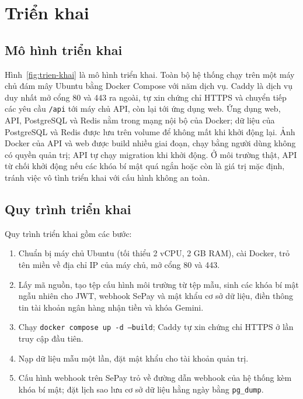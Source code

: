 \section{Triển khai}

\subsection{Mô hình triển khai}


Hình~\ref{fig:trien-khai} là mô hình triển khai. Toàn bộ hệ thống chạy trên một máy chủ đám mây Ubuntu bằng Docker Compose với năm dịch vụ. Caddy là dịch vụ duy nhất mở cổng 80 và 443 ra ngoài, tự xin chứng chỉ HTTPS và chuyển tiếp các yêu cầu \texttt{/api} tới máy chủ API, còn lại tới ứng dụng web. Ứng dụng web, API, PostgreSQL và Redis nằm trong mạng nội bộ của Docker; dữ liệu của PostgreSQL và Redis được lưu trên volume để không mất khi khởi động lại. Ảnh Docker của API và web được build nhiều giai đoạn, chạy bằng người dùng không có quyền quản trị; API tự chạy migration khi khởi động. Ở môi trường thật, API từ chối khởi động nếu các khóa bí mật quá ngắn hoặc còn là giá trị mặc định, tránh việc vô tình triển khai với cấu hình không an toàn.

\subsection{Quy trình triển khai}

Quy trình triển khai gồm các bước:
\begin{enumerate}
  \item Chuẩn bị máy chủ Ubuntu (tối thiểu 2 vCPU, 2 GB RAM), cài Docker, trỏ tên miền về địa chỉ IP của máy chủ, mở cổng 80 và 443.
  \item Lấy mã nguồn, tạo tệp cấu hình môi trường từ tệp mẫu, sinh các khóa bí mật ngẫu nhiên cho JWT, webhook SePay và mật khẩu cơ sở dữ liệu, điền thông tin tài khoản ngân hàng nhận tiền và khóa Gemini.
  \item Chạy \texttt{docker compose up -d --build}; Caddy tự xin chứng chỉ HTTPS ở lần truy cập đầu tiên.
  \item Nạp dữ liệu mẫu một lần, đặt mật khẩu cho tài khoản quản trị.
  \item Cấu hình webhook trên SePay trỏ về đường dẫn webhook của hệ thống kèm khóa bí mật; đặt lịch sao lưu cơ sở dữ liệu hằng ngày bằng \texttt{pg\_dump}.
\end{enumerate}

